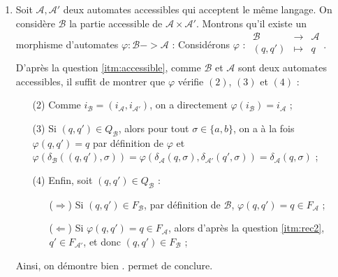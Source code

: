 \documentclass{article}
\begin{document}
\begin{enumerate}
    \item \label{itm:produit} Soit $\mathcal{A}, \mathcal{A}'$ deux automates accessibles qui acceptent le même langage. On considère $\mathcal{B}$ la partie accessible de $\mathcal{A} \times \mathcal{A'}$. \newline
    Montrons qu'il existe un morphisme d'automates $\varphi : \mathcal{B} -> \mathcal{A}$ : \newline
    Considérons $\varphi$ : $\begin{array}{ccc}
        \mathcal{B} & \to & \mathcal{A} \\
        (q, q') & \mapsto & q \\
        \end{array}$. \newline
    D'après la question \ref{itm:accessible}, comme $\mathcal{B}$ et $\mathcal{A}$ sont deux automates accessibles, il suffit de montrer que $\varphi$ vérifie $(2)$, $(3)$ et $(4)$ :
    \begin{itemize}
        \item[(2)] Comme $i_\mathcal{B} = (i_\mathcal{A}, i_\mathcal{A'})$, on a directement $\varphi(i_\mathcal{B}) = i_\mathcal{A}$ ;
        \item[(3)] Si $(q, q') \in Q_\mathcal{B}$, alors pour tout $\sigma \in \{a, b \}$, on a à la fois $\varphi(q, q') = q$ par définition de $\varphi$ et $\varphi(\delta_\mathcal{B}((q, q'), \sigma)) = \varphi(\delta_\mathcal{A}(q, \sigma), \delta_\mathcal{A'}(q', \sigma)) = \delta_\mathcal{A}(q, \sigma)$ ;
        \item[(4)] Enfin, soit $(q, q') \in Q_\mathcal{B}$ : 
            \begin{itemize}
                \item[($\Rightarrow$)] Si $(q, q') \in F_\mathcal{B}$, par définition de $\mathcal{B}$, $\varphi(q, q') = q \in F_\mathcal{A}$ ;
                \item[($\Leftarrow$)] Si $\varphi(q, q') = q \in F_\mathcal{A}$, alors d'après la question \ref{itm:rec2}, $q' \in F_\mathcal{A'}$, et donc $(q, q') \in F_\mathcal{B}$ ; 
            \end{itemize}
    \end{itemize}
    Ainsi, on démontre bien . \newline
     permet de conclure.
\end{enumerate}
\end{document}
